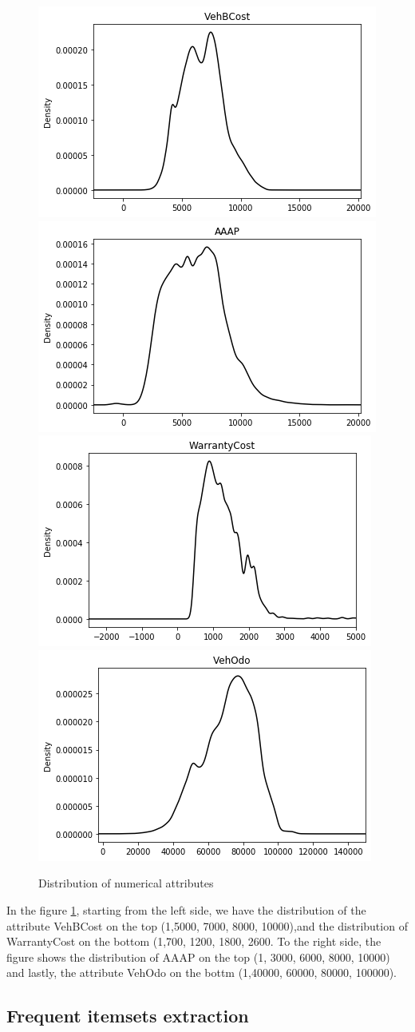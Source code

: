 \documentclass{article}
\begin{document}
	\begin{figure}[H]
		\centering
		\includegraphics[width=.4\textwidth]{vehbcost}\hspace{1cm}
		\includegraphics[width=.4\textwidth]{AAAP}
		\includegraphics[width=.4\textwidth]{warrantycost}\hspace{1cm}
		\includegraphics[width=.4\textwidth]{vehodo}
		\caption{Distribution of numerical attributes}
		\label{fig:hyper_rf}
	\end{figure}
	
	In the figure \ref{fig:hyper_rf}, starting from the left side, we have the distribution of the attribute VehBCost on the top (1,5000, 7000, 8000, 10000),and the distribution of WarrantyCost on the bottom (1,700, 1200, 1800, 2600. 
	To the right side, the figure shows the distribution of AAAP on the top (1, 3000, 6000, 8000, 10000) and lastly, the attribute VehOdo on the bottm (1,40000, 60000, 80000, 100000). %
	
	\subsection{Frequent itemsets extraction}
	
\end{document}
